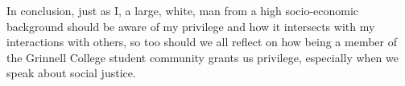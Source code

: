 \documentclass[12pt]{article}[titlepage]
\newcommand{\1}{\={a}}
\newcommand{\2}{\={e}}
\newcommand{\3}{\={\i}}
\newcommand{\4}{\=o}
\newcommand{\5}{\=u}
\newcommand{\6}{\={A}}
\renewcommand{\,}{\textsuperscript{,}}
\begin{document}
In conclusion, just as I, a large, white, man from a high socio-economic background should be aware of my privilege and how it intersects with my interactions with others, so too should we all reflect on how being a member of the Grinnell College student community grants us privilege, especially when we speak about social justice.
\end{document}
